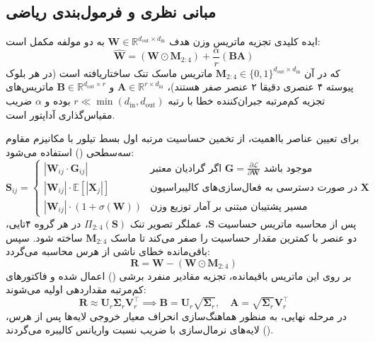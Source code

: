 \subsection{مبانی نظری و فرمول‌بندی ریاضی}
ایده کلیدی  تجزیه ماتریس وزن هدف $\mathbf{W} \in \mathbb{R}^{d_{\text{out}} \times d_{\text{in}}}$ به دو مولفه مکمل است:
\begin{equation}
\hat{\mathbf{W}} = (\mathbf{W} \odot \mathbf{M}_{2:4}) + \frac{\alpha}{r} (\mathbf{B} \mathbf{A})
\end{equation}
که در آن $\mathbf{M}_{2:4} \in \{0, 1\}^{d_{\text{out}} \times d_{\text{in}}}$ ماتریس ماسک تنک ساختاریافته  است (در هر بلوک پیوسته ۴ عنصری دقیقا ۲ عنصر صفر هستند)، $\mathbf{A} \in \mathbb{R}^{r \times d_{\text{in}}}$ و $\mathbf{B} \in \mathbb{R}^{d_{\text{out}} \times r}$ ماتریس‌های تجزیه کم‌مرتبه جبران‌کننده خطا با رتبه $r \ll \min(d_{\text{in}}, d_{\text{out}})$ بوده و $\alpha$ ضریب مقیاس‌گذاری آداپتور  است.

برای تعیین عناصر بااهمیت، از تخمین حساسیت مرتبه اول بسط تیلور با مکانیزم مقاوم سه‌سطحی () استفاده می‌شود:
\begin{equation}
\mathbf{S}_{ij} =
\begin{cases}
|\mathbf{W}_{ij} \cdot \mathbf{G}_{ij}| & \text{اگر گرادیان معتبر } \mathbf{G} = \frac{\partial \mathcal{L}}{\partial \mathbf{W}} \text{ موجود باشد} \\
|\mathbf{W}_{ij}| \cdot \mathbb{E}[|\mathbf{X}_j|] & \text{در صورت دسترسی به فعال‌سازی‌های کالیبراسیون } \mathbf{X} \\
|\mathbf{W}_{ij}| \cdot (1 + \sigma(\mathbf{W})) & \text{مسیر پشتیبان مبتنی بر آمار توزیع وزن}
\end{cases}
\end{equation}
پس از محاسبه ماتریس حساسیت $\mathbf{S}$، عملگر تصویر تنک $\Pi_{2:4}(\mathbf{S})$ در هر گروه ۴‌تایی، دو عنصر با کمترین مقدار حساسیت را صفر می‌کند تا ماسک $\mathbf{M}_{2:4}$ ساخته شود. سپس باقی‌مانده خطای ناشی از هرس محاسبه می‌گردد:
\begin{equation}
\mathbf{R} = \mathbf{W} - (\mathbf{W} \odot \mathbf{M}_{2:4})
\end{equation}
بر روی این ماتریس باقیمانده، تجزیه مقادیر منفرد برشی () اعمال شده و فاکتورهای کم‌مرتبه مقداردهی اولیه می‌شوند:
\begin{equation}
\mathbf{R} \approx \mathbf{U}_r \mathbf{\Sigma}_r \mathbf{V}_r^\top \implies \mathbf{B} = \mathbf{U}_r \sqrt{\mathbf{\Sigma}_r}, \quad \mathbf{A} = \sqrt{\mathbf{\Sigma}_r} \mathbf{V}_r^\top
\end{equation}
در مرحله نهایی، به منظور هماهنگ‌سازی انحراف معیار خروجی لایه‌ها پس از هرس، لایه‌های نرمال‌سازی با ضریب نسبت واریانس کالیبره می‌گردند ().

